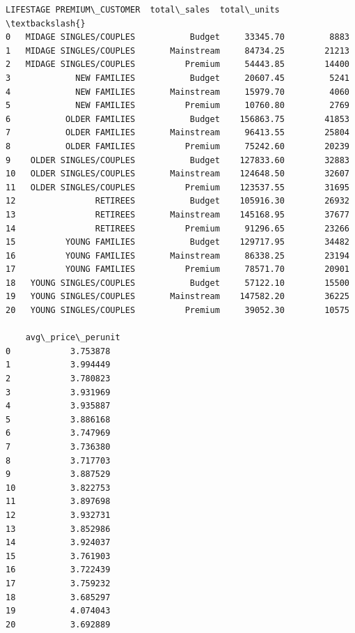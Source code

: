 \documentclass[11pt]{article}
\makeatletter
\newcommand{\boxspacing}{\kern\kvtcb@left@rule\kern\kvtcb@boxsep}
\newcommand{\prompt}[4]{
        {\ttfamily\llap{{\color{#2}[#3]:\hspace{3pt}#4}}\vspace{-\baselineskip}}
    }
\makeatother
\begin{document}
            \begin{tcolorbox}[breakable, size=fbox, boxrule=.5pt, pad at break*=1mm, opacityfill=0]
\prompt{Out}{outcolor}{306}{\boxspacing}
\begin{Verbatim}[commandchars=\\\{\}]
                 LIFESTAGE PREMIUM\_CUSTOMER  total\_sales  total\_units  \textbackslash{}
0   MIDAGE SINGLES/COUPLES           Budget     33345.70         8883
1   MIDAGE SINGLES/COUPLES       Mainstream     84734.25        21213
2   MIDAGE SINGLES/COUPLES          Premium     54443.85        14400
3             NEW FAMILIES           Budget     20607.45         5241
4             NEW FAMILIES       Mainstream     15979.70         4060
5             NEW FAMILIES          Premium     10760.80         2769
6           OLDER FAMILIES           Budget    156863.75        41853
7           OLDER FAMILIES       Mainstream     96413.55        25804
8           OLDER FAMILIES          Premium     75242.60        20239
9    OLDER SINGLES/COUPLES           Budget    127833.60        32883
10   OLDER SINGLES/COUPLES       Mainstream    124648.50        32607
11   OLDER SINGLES/COUPLES          Premium    123537.55        31695
12                RETIREES           Budget    105916.30        26932
13                RETIREES       Mainstream    145168.95        37677
14                RETIREES          Premium     91296.65        23266
15          YOUNG FAMILIES           Budget    129717.95        34482
16          YOUNG FAMILIES       Mainstream     86338.25        23194
17          YOUNG FAMILIES          Premium     78571.70        20901
18   YOUNG SINGLES/COUPLES           Budget     57122.10        15500
19   YOUNG SINGLES/COUPLES       Mainstream    147582.20        36225
20   YOUNG SINGLES/COUPLES          Premium     39052.30        10575

    avg\_price\_perunit
0            3.753878
1            3.994449
2            3.780823
3            3.931969
4            3.935887
5            3.886168
6            3.747969
7            3.736380
8            3.717703
9            3.887529
10           3.822753
11           3.897698
12           3.932731
13           3.852986
14           3.924037
15           3.761903
16           3.722439
17           3.759232
18           3.685297
19           4.074043
20           3.692889
\end{Verbatim}
\end{tcolorbox}
        
\end{document}
